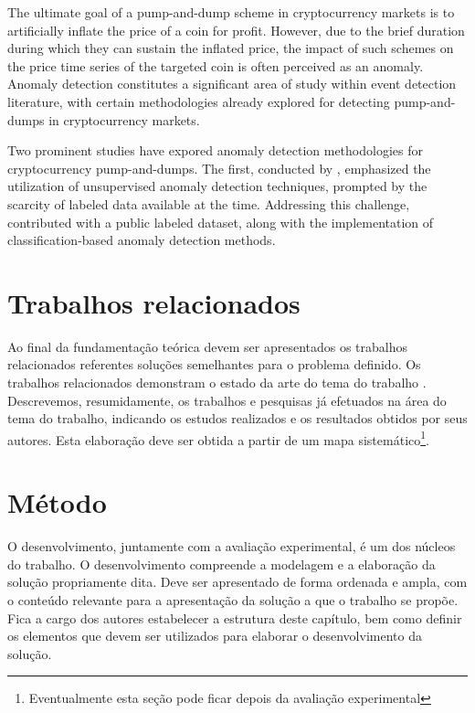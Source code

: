 \documentclass[12pt]{article}
\begin{document}
	The ultimate goal of a pump-and-dump scheme in cryptocurrency markets is to artificially inflate the price of a coin for profit.
	However, due to the brief duration during which they can sustain the inflated price, the impact of such schemes on the price time series of the targeted coin is often perceived as an anomaly.
	Anomaly detection constitutes a significant area of study within event detection literature, with certain methodologies already explored for detecting pump-and-dumps in cryptocurrency markets.

	Two prominent studies have expored anomaly detection methodologies for cryptocurrency pump-and-dumps.
	The first, conducted by \citet{kamps2018}, emphasized the utilization of unsupervised anomaly detection techniques, prompted by the scarcity of labeled data available at the time.
	Addressing this challenge, \citet{lamorgia2020} contributed with a public labeled dataset, along with the implementation of classification-based anomaly detection methods.

	\section{Trabalhos relacionados}
	\label{sec_trab_relacionados}
	
	Ao final da fundamentação teórica devem ser apresentados os trabalhos relacionados referentes soluções semelhantes para o problema definido. Os trabalhos relacionados demonstram o estado da arte do tema do trabalho \citep{wazlawick_metodologia_2017}. Descrevemos, resumidamente, os trabalhos e pesquisas já efetuados na área do tema do trabalho, indicando os estudos realizados e os resultados obtidos por seus autores. Esta elaboração deve ser obtida a partir de um mapa sistemático\footnote{Eventualmente esta seção pode ficar depois da avaliação experimental}. 
	
	\section{Método}
	\label{sec_metodo}
	
	O desenvolvimento, juntamente com a avaliação experimental, é um dos núcleos do trabalho. O desenvolvimento compreende a modelagem e a elaboração da solução propriamente dita. Deve ser apresentado de forma ordenada e ampla, com o conteúdo relevante para a apresentação da solução a que o trabalho se propõe. Fica a cargo dos autores estabelecer a estrutura deste capítulo, bem como definir os elementos que devem ser utilizados para elaborar o desenvolvimento da solução. 
	
\end{document}
